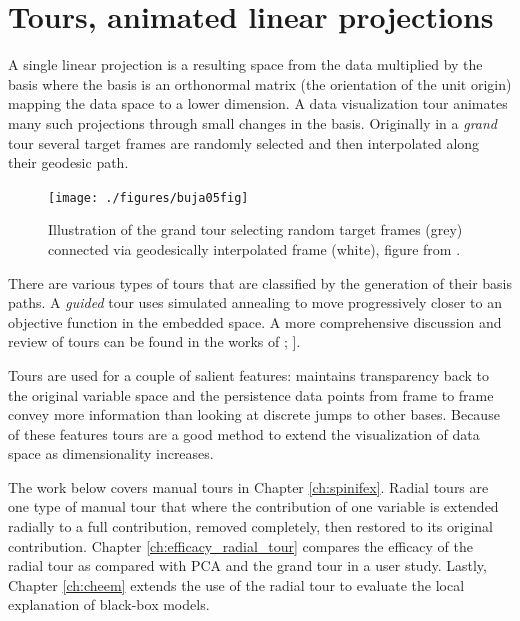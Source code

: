 \documentclass{template/monashthesis}
\begin{document}
\hypertarget{tours-animated-linear-projections}{%
\section{Tours, animated linear projections}\label{tours-animated-linear-projections}}

A single linear projection is a resulting space from the data multiplied by the basis where the basis is an orthonormal matrix (the orientation of the unit origin) mapping the data space to a lower dimension. A data visualization tour animates many such projections through small changes in the basis. Originally in a \emph{grand} tour \autocite{asimov_grand_1985} several target frames are randomly selected and then interpolated along their geodesic path.



\begin{figure}

{\centering \texttt{[image: ./figures/buja05fig]} 

}

\caption{Illustration of the grand tour selecting random target frames (grey) connected via geodesically interpolated frame (white), figure from \textcite{buja_computational_2005}.}\label{fig:buja05fig}
\end{figure}

There are various types of tours that are classified by the generation of their basis paths. A \emph{guided} tour uses simulated annealing to move progressively closer to an objective function in the embedded space\autocite{hurley_analyzing_1990}. A more comprehensive discussion and review of tours can be found in the works of \textcite{cook_grand_2008}; \textcite{lee_review_2021}{]}.

Tours are used for a couple of salient features: maintains transparency back to the original variable space and the persistence data points from frame to frame convey more information than looking at discrete jumps to other bases. Because of these features tours are a good method to extend the visualization of data space as dimensionality increases.

The work below covers manual tours \autocite{cook_manual_1997,spyrison_spinifex_2020} in Chapter \ref{ch:spinifex}. Radial tours are one type of manual tour that where the contribution of one variable is extended radially to a full contribution, removed completely, then restored to its original contribution. Chapter \ref{ch:efficacy_radial_tour} compares the efficacy of the radial tour as compared with PCA and the grand tour in a user study. Lastly, Chapter \ref{ch:cheem} extends the use of the radial tour to evaluate the local explanation of black-box models.
\end{document}

